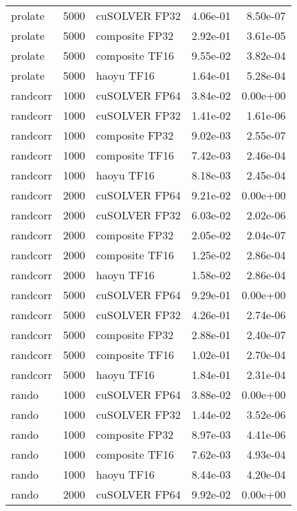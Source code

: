 \begin{table}
\begin{tabular}{lrlrr}
  prolate &  5000 &  cuSOLVER FP32 &  4.06e-01 &        8.50e-07 \\
  prolate &  5000 & composite FP32 &  2.92e-01 &        3.61e-05 \\
  prolate &  5000 & composite TF16 &  9.55e-02 &        3.82e-04 \\
  prolate &  5000 &     haoyu TF16 &  1.64e-01 &        5.28e-04 \\
 randcorr &  1000 &  cuSOLVER FP64 &  3.84e-02 &        0.00e+00 \\
 randcorr &  1000 &  cuSOLVER FP32 &  1.41e-02 &        1.61e-06 \\
 randcorr &  1000 & composite FP32 &  9.02e-03 &        2.55e-07 \\
 randcorr &  1000 & composite TF16 &  7.42e-03 &        2.46e-04 \\
 randcorr &  1000 &     haoyu TF16 &  8.18e-03 &        2.45e-04 \\
 randcorr &  2000 &  cuSOLVER FP64 &  9.21e-02 &        0.00e+00 \\
 randcorr &  2000 &  cuSOLVER FP32 &  6.03e-02 &        2.02e-06 \\
 randcorr &  2000 & composite FP32 &  2.05e-02 &        2.04e-07 \\
 randcorr &  2000 & composite TF16 &  1.25e-02 &        2.86e-04 \\
 randcorr &  2000 &     haoyu TF16 &  1.58e-02 &        2.86e-04 \\
 randcorr &  5000 &  cuSOLVER FP64 &  9.29e-01 &        0.00e+00 \\
 randcorr &  5000 &  cuSOLVER FP32 &  4.26e-01 &        2.74e-06 \\
 randcorr &  5000 & composite FP32 &  2.88e-01 &        2.40e-07 \\
 randcorr &  5000 & composite TF16 &  1.02e-01 &        2.70e-04 \\
 randcorr &  5000 &     haoyu TF16 &  1.84e-01 &        2.31e-04 \\
    rando &  1000 &  cuSOLVER FP64 &  3.88e-02 &        0.00e+00 \\
    rando &  1000 &  cuSOLVER FP32 &  1.44e-02 &        3.52e-06 \\
    rando &  1000 & composite FP32 &  8.97e-03 &        4.41e-06 \\
    rando &  1000 & composite TF16 &  7.62e-03 &        4.93e-04 \\
    rando &  1000 &     haoyu TF16 &  8.44e-03 &        4.20e-04 \\
    rando &  2000 &  cuSOLVER FP64 &  9.92e-02 &        0.00e+00 \\

\end{tabular}
\end{table}
